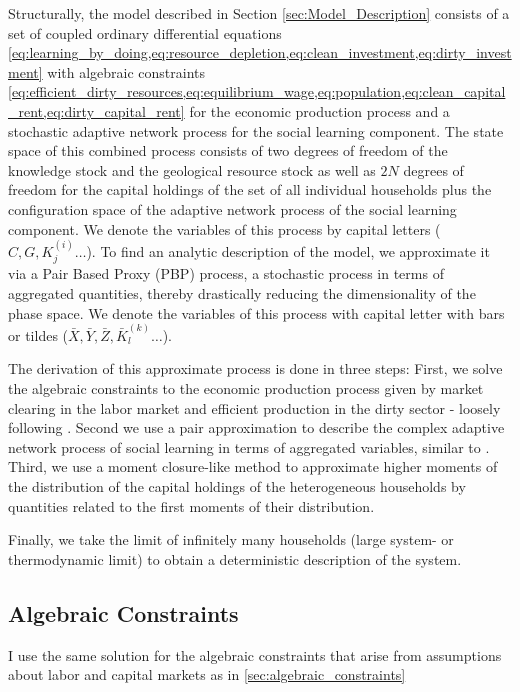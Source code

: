 Structurally, the model described in Section \ref{sec:Model_Description} consists of a set of coupled ordinary differential equations \cref{eq:learning_by_doing,eq:resource_depletion,eq:clean_investment,eq:dirty_investment} with algebraic constraints \cref{eq:efficient_dirty_resources,eq:equilibrium_wage,eq:population,eq:clean_capital_rent,eq:dirty_capital_rent} for the economic production process and a stochastic adaptive network process for the social learning component. The state space of this combined process consists of two degrees of freedom of the knowledge stock and the geological resource stock as well as $2N$ degrees of freedom for the capital holdings of the set of all individual households plus the configuration space of the adaptive network process of the social learning component. We denote the variables of this process by capital letters ($C, G, K_j^{(i)}\dots$).
To find an analytic description of the model, we approximate it via a Pair Based Proxy (PBP) process, a stochastic process in terms of aggregated quantities, thereby drastically reducing the dimensionality of the phase space. We denote the variables of this process with capital letter with bars or tildes ($\bar{X}, \bar{Y}, \bar{Z}, \bar{K}_l^{(k)}\dots$).

The derivation of this approximate process is done in three steps: First, we solve the algebraic constraints to the economic production process given by market clearing in the labor market and efficient production in the dirty sector - loosely following \cite{Nitzbon2017}. Second we use a pair approximation to describe the complex adaptive network process of social learning in terms of aggregated variables, similar to \cite{Rogers2012}. Third, we use a moment closure-like method to approximate higher moments of the distribution of the capital holdings of the heterogeneous households by quantities related to the first moments of their distribution.

Finally, we take the limit of infinitely many households (large system- or thermodynamic limit) to obtain a deterministic description of the system.

\subsection{Algebraic Constraints}
I use the same solution for the algebraic constraints that arise from assumptions about labor and capital markets as in \ref{sec:algebraic_constraints}

